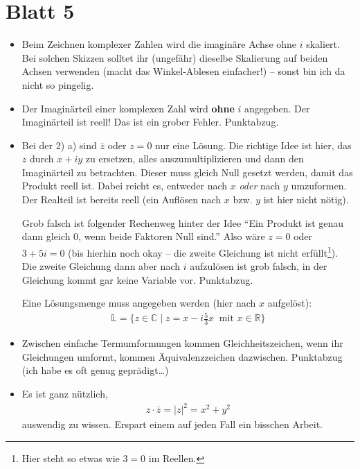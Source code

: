 \documentclass[11pt, a4paper]{article}
\newcommand{\Lsg}{\mathbb{L}}
\newcommand{\R}{\mathbb{R}}
\newcommand{\C}{\mathbb{C}}
\begin{document}
\newpage
\section*{Blatt 5}
\begin{itemize}
\item Beim Zeichnen komplexer Zahlen wird die imaginäre Achse ohne $i$ skaliert. Bei solchen Skizzen solltet ihr (ungefähr) dieselbe Skalierung auf beiden Achsen verwenden (macht das Winkel-Ablesen einfacher!) -- sonst bin ich da nicht so pingelig.

\item Der Imaginärteil einer komplexen Zahl wird \textbf{ohne} $i$ angegeben. Der Imaginärteil ist reell! Das ist ein grober Fehler. Punktabzug.

\item Bei der 2) a) sind $\overline{z}$ oder $z = 0$ nur eine Lösung. Die richtige Idee ist hier, das $z$ durch $x + iy$ zu ersetzen, alles auszumultiplizieren und dann den Imaginärteil zu betrachten. Dieser muss gleich Null gesetzt werden, damit das Produkt reell ist. Dabei reicht es, entweder nach $x$ \emph{oder} nach $y$ umzuformen. Der Realteil ist bereits reell (ein Auflösen nach $x$ bzw. $y$ ist hier nicht nötig).

Grob falsch ist folgender Rechenweg hinter der Idee \enquote{Ein Produkt ist genau dann gleich 0, wenn beide Faktoren Null sind.} Also wäre $z = 0$ oder $3 + 5i = 0$ (bis hierhin noch okay -- die zweite Gleichung ist nicht erfüllt\footnote{Hier steht so etwas wie $3 = 0$ im Reellen.}). Die zweite Gleichung dann aber nach $i$ aufzulösen ist grob falsch, in der Gleichung kommt gar keine Variable vor. Punktabzug. 

Eine Lösungsmenge muss angegeben werden (hier nach $x$ aufgelöst):
\begin{align*}
\Lsg = \{ z \in \C \mid z = x - i\frac{5}{3}x\ \text{~mit~} x \in \R\}
\end{align*}


\item Zwischen einfache Termumformungen kommen Gleichheitszeichen, wenn ihr Gleichungen umformt, kommen Äquivalenzzeichen dazwischen. Punktabzug (ich habe es oft genug geprädigt\dots)

\item Es ist ganz nützlich,
\begin{align*}
z\cdot\overline{z} = |z|^2 = x^2 + y^2
\end{align*}
auswendig zu wissen. Erspart einem auf jeden Fall ein bisschen Arbeit.


\end{itemize}
\end{document}
